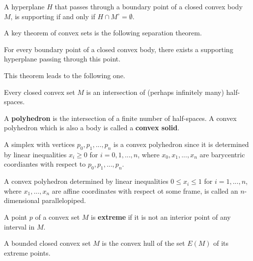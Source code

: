   \begin{theorem}
    A hyperplane $H$ that passes through a boundary point of a closed convex body $M$, is supporting if and only if $H \cap M^\circ = \emptyset$. 
  \end{theorem}

  A key theorem of convex sets is the following separation theorem. 

  \begin{theorem}
    For every boundary point of a closed convex body, there exists a supporting hyperplane passing through this point. 
  \end{theorem}

  This theorem leads to the following one. 

  \begin{theorem}
    Every closed convex set $M$ is an intersection of (perhaps infinitely many) half-spaces. 
  \end{theorem}

  \begin{definition}
    A \textbf{polyhedron} is the intersection of a finite number of half-spaces. A convex polyhedron which is also a body is called a \textbf{convex solid}. 
  \end{definition}

  \begin{example}
    A simplex with vertices $p_0, p_1, ..., p_n$ is a convex polyhedron since it is determined by linear inequalities $x_i \geq 0$ for $i = 0, 1, ..., n$, where $x_0, x_1, ..., x_n$ are barycentric coordiantes with respect to $p_0, p_1,..., p_n$. 
  \end{example}

  \begin{example}
    A convex polyhedron determined by linear inequalities $0 \leq x_i \leq 1$ for $i = 1, ..., n$, where $x_1,..., x_n$ are affine coordinates with respect ot some frame, is called an $n$-dimensional parallelopiped. 
  \end{example}

  \begin{definition}
    A point $p$ of a convex set $M$ is \textbf{extreme} if it is not an interior point of any interval in $M$. 
  \end{definition}

  \begin{theorem}
    A bounded closed convex set $M$ is the convex hull of the set $E(M)$ of its extreme points. 
  \end{theorem}

